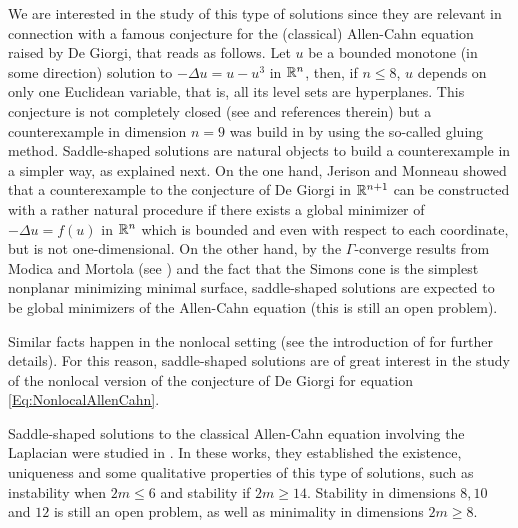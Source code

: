 We are interested in the study of this type of solutions since they are relevant in connection with a famous conjecture for the (classical) Allen-Cahn equation raised by De Giorgi, that reads as follows. Let $u$ be a bounded monotone (in some direction) solution to $-\Delta u = u - u^3$ in $\mathbb{R}^n$, then, if $n \leq 8$, $u$ depends on only one Euclidean variable, that is, all its level sets are hyperplanes. This conjecture is not completely closed (see \cite{FarinaValdinoci-DeGiorgi} and references therein) but a counterexample in dimension $n=9$ was build in \cite{delPinoKowalczykWei} by using the so-called gluing method. Saddle-shaped solutions are natural objects to build a counterexample in a simpler way, as explained next. On the one hand, Jerison and Monneau \cite{JerisonMonneau} showed that a counterexample to the conjecture of De Giorgi in $\mathbb{R}^{n+1}$ can be constructed with a rather natural procedure if there exists a global minimizer of $-\Delta u = f(u)$ in $\mathbb{R}^n$ which is bounded and even with respect to each coordinate, but is not one-dimensional. On the other hand, by the $\Gamma$-converge results from Modica and Mortola (see \cite{Modica,ModicaMortola}) and the fact that the Simons cone is the simplest nonplanar minimizing minimal surface, saddle-shaped solutions are expected to be global minimizers of the Allen-Cahn equation (this is still an open problem).

Similar facts happen in the nonlocal setting (see the introduction of \cite{Felipe-Sanz-Perela:SaddleFractional} for further details). For this reason, saddle-shaped solutions are of great interest in the study of the nonlocal version of the conjecture of De Giorgi for equation \eqref{Eq:NonlocalAllenCahn}.

Saddle-shaped solutions to the classical Allen-Cahn equation involving the Laplacian were studied in \cite{DangFifePeletier, Schatzman, CabreTerraI,CabreTerraII, Cabre-Saddle}. In these works, they established the existence, uniqueness and some qualitative properties of this type of solutions, such as instability when $2m\leq 6$ and stability if $2m\geq 14$. Stability in dimensions $8, 10$ and $12$ is still an open problem, as well as minimality in dimensions $2m\geq 8$.

